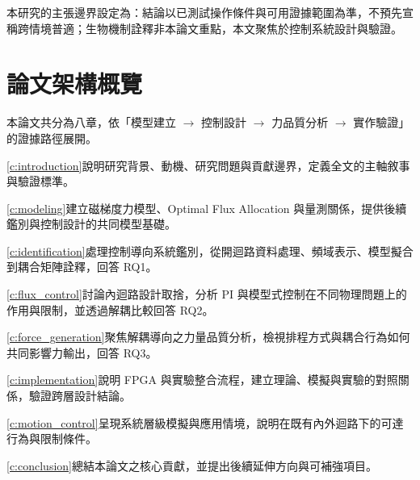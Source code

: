 本研究的主張邊界設定為：結論以已測試操作條件與可用證據範圍為準，不預先宣稱跨情境普適；生物機制詮釋非本論文重點，本文聚焦於控制系統設計與驗證。

\section{論文架構概覽}
\label{sec:outline}

本論文共分為八章，依「模型建立 $\rightarrow$ 控制設計 $\rightarrow$ 力品質分析 $\rightarrow$ 實作驗證」的證據路徑展開。

\cref{c:introduction}說明研究背景、動機、研究問題與貢獻邊界，定義全文的主軸敘事與驗證標準。

\cref{c:modeling}建立磁梯度力模型、Optimal Flux Allocation 與量測關係，提供後續鑑別與控制設計的共同模型基礎。

\cref{c:identification}處理控制導向系統鑑別，從開迴路資料處理、頻域表示、模型擬合到耦合矩陣詮釋，回答 RQ1。

\cref{c:flux_control}討論內迴路設計取捨，分析 PI 與模型式控制在不同物理問題上的作用與限制，並透過解耦比較回答 RQ2。

\cref{c:force_generation}聚焦解耦導向之力量品質分析，檢視排程方式與耦合行為如何共同影響力輸出，回答 RQ3。

\cref{c:implementation}說明 FPGA 與實驗整合流程，建立理論、模擬與實驗的對照關係，驗證跨層設計結論。

\cref{c:motion_control}呈現系統層級模擬與應用情境，說明在既有內外迴路下的可達行為與限制條件。

\cref{c:conclusion}總結本論文之核心貢獻，並提出後續延伸方向與可補強項目。
